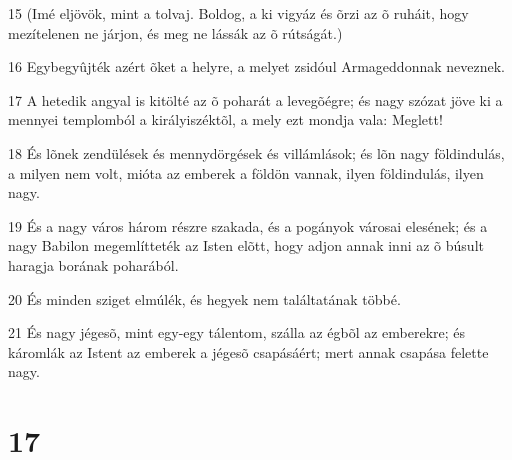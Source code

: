 \par 15 (Imé eljövök, mint a tolvaj. Boldog, a ki vigyáz és õrzi az õ  ruháit, hogy mezítelenen ne járjon, és meg ne lássák az õ rútságát.)
\par 16 Egybegyûjték azért õket a helyre, a melyet zsidóul Armageddonnak neveznek.
\par 17 A hetedik angyal is kitölté az õ poharát a levegõégre; és nagy szózat jöve ki a mennyei templomból a királyiszéktõl, a mely ezt mondja vala: Meglett!
\par 18 És lõnek zendülések és mennydörgések és villámlások; és lõn nagy földindulás, a milyen nem volt, mióta az emberek a földön vannak, ilyen földindulás, ilyen nagy.
\par 19 És a nagy város három részre szakada, és a pogányok városai elesének; és a nagy Babilon  megemlítteték az Isten elõtt, hogy adjon annak inni az õ búsult haragja  borának poharából.
\par 20 És minden sziget elmúlék, és hegyek nem találtatának többé.
\par 21 És nagy jégesõ, mint egy-egy tálentom, szálla az égbõl az emberekre; és káromlák az Istent az emberek a jégesõ csapásáért; mert annak csapása felette nagy.

\chapter{17}

